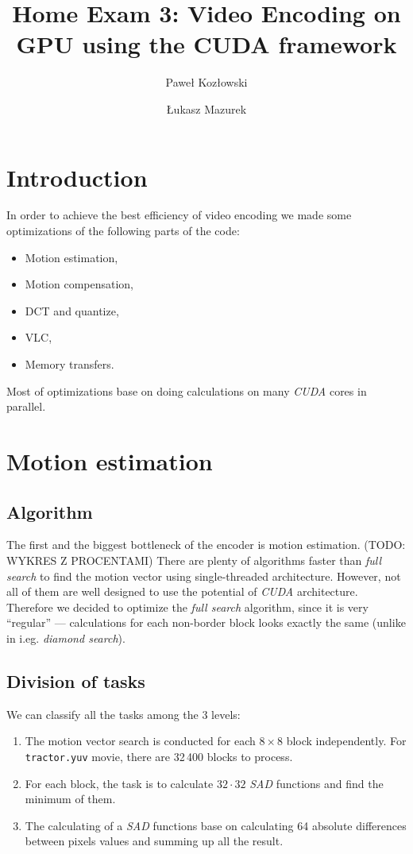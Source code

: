 \documentclass[11pt]{article}
\title{Home Exam 3: Video Encoding on GPU using the CUDA framework}
\author{Paweł Kozłowski \and Łukasz Mazurek}
\begin{document}
\maketitle
\tableofcontents

\section{Introduction}
In order to achieve the best efficiency of video encoding we made some optimizations of the following parts of the code:
\begin{itemize}
  \item Motion estimation,
  \item Motion compensation,
  \item DCT and quantize,
  \item VLC,
  \item Memory transfers.
\end{itemize}
Most of optimizations base on doing calculations on many \emph{CUDA} cores
in parallel.

\section{Motion estimation}

\subsection{Algorithm}
The first and the biggest bottleneck of the encoder is motion estimation.
(TODO: WYKRES Z PROCENTAMI)
There are plenty of algorithms faster than \emph{full search} to find the
motion vector using single-threaded architecture.
However, not all of them are well designed to use the potential of \emph{CUDA}
architecture.
Therefore we decided to optimize the \emph{full search} algorithm, since
it is very ``regular'' --- calculations for each non-border block looks exactly
the same (unlike in i.eg. \emph{diamond search}).

\subsection{Division of tasks}
We can classify all the tasks among the 3 levels:
\begin{enumerate}
  \item The motion vector search is conducted for each $8 \times 8$ block 
  independently.
  For \texttt{tractor.yuv} movie, there are 32\,400 blocks to process.
  \item For each block, the task is to calculate $32 \cdot 32$ \emph{SAD} 
  functions and find the minimum of them.
  \item The calculating of a \emph{SAD} functions base on calculating 
  64 absolute differences between pixels values and summing up all the result.
\end{enumerate}
\end{document}
